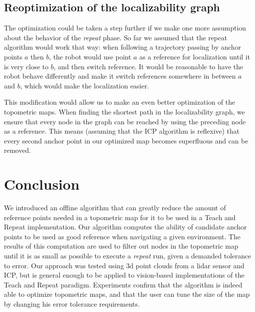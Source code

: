 \documentclass[letterpaper,10 pt,conference]{ieeeconf}
\begin{document}
\subsection{Reoptimization of the localizability graph}

The optimization could be taken a step further if we make one more assumption about the behavior
of the \textit{repeat} phase. So far we assumed that the repeat algorithm would work that way: when
following a trajectory passing by anchor points $a$ then $b$, the robot would use point $a$ as a
reference for localization until it is very close to $b$, and then switch reference. It would be
reasonable to have the robot behave differently and make it switch references somewhere in between
$a$ and $b$, which would make the localization easier.

This modification would allow us to make an even better optimization of the topometric maps. When
finding the shortest path in the localizability graph, we ensure that every node in the graph can be
reached by using the preceding node as a reference. This means (assuming that the ICP algorithm is
reflexive) that every second anchor point in our optimized map becomes superfluous and can be removed.

\section{Conclusion}

We introduced an offline algorithm that can greatly reduce the amount of reference points needed in
a topometric map for it to be used in a Teach and Repeat implementation. Our algorithm computes the
ability of candidate anchor points to be used as good reference when navigating a given
environment. The results of this computation are used to filter out nodes in the topometric map
until it is as small as possible to execute a \textit{repeat} run, given a demanded tolerance to
error. Our approach was tested using 3d point clouds from a lidar sensor and ICP, but is general
enough to be applied to vision-based implementations of the Teach and Repeat paradigm. Experiments
confirm that the algorithm is indeed able to optimize topometric maps, and that the user can tune
the size of the map by changing his error tolerance requirements.

\printbibliography
\end{document}
